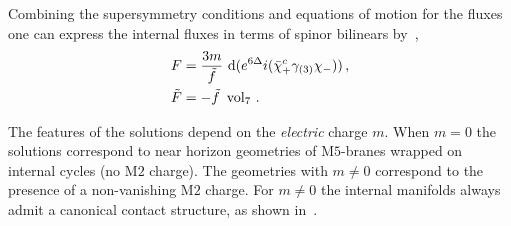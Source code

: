 \documentclass[debug]{phd}
\begin{document}
Combining the supersymmetry conditions and equations of motion for the fluxes one can express the internal fluxes in terms of spinor bilinears by~\cite{Gabella:2012rc},
%
	\begin{align}
		F &= \dfrac{3 m}{\tilde{f}}\ \mathrm{d}  (e^{6 \Delta} i( \bar{\chi}_+^c \gamma_{(3)} \chi_-))\, , \\
		\tilde{F} &= - \tilde{f}\ \operatorname{vol}_7 \, . 
	\end{align}
%

The features of the solutions depend on the \emph{electric} charge $m$. 
When $m=0$ the solutions correspond to near horizon geometries of $\mathrm{M}5$-branes wrapped on internal cycles (no $\mathrm{M}2$ charge). 
The geometries with $m\neq0$ correspond to the presence of a non-vanishing $\mathrm{M}2$ charge. 
For $m \neq 0$ the internal manifolds always admit a canonical contact structure, as shown in~\cite{Gabella:2012rc}. \\
\end{document}
